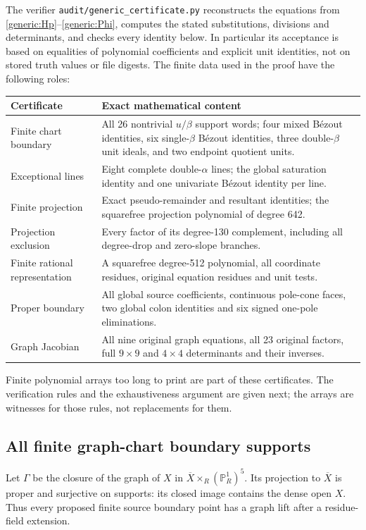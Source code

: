 \documentclass[11pt,a4paper]{article}
\theoremstyle{remark}\newtheorem{remark}[theorem]{Remark}
\begin{document}
The verifier \texttt{audit/generic\_certificate.py} reconstructs the
equations from \eqref{generic:Hp}--\eqref{generic:Phi}, computes the
stated substitutions, divisions and determinants, and checks every
identity below. In particular its acceptance is based on equalities of
polynomial coefficients and explicit unit identities, not on stored
truth values or file digests. The finite data used in the proof have
the following roles:
\begin{center}\small
\begin{tabular}{@{}lp{}@{}}\toprule
Certificate & Exact mathematical content\\\midrule
Finite chart boundary & All 26 nontrivial $u/\beta$ support words;
four mixed B\'ezout identities, six single-$\beta$ B\'ezout identities,
three double-$\beta$ unit ideals, and two endpoint quotient units.\\
Exceptional lines & Eight complete double-$\alpha$ lines; the global
saturation identity and one univariate B\'ezout identity per line.\\
Finite projection & Exact pseudo-remainder and resultant identities;
the squarefree projection polynomial of degree 642.\\
Projection exclusion & Every factor of its degree-130 complement,
including all degree-drop and zero-slope branches.\\
Finite rational representation & A squarefree degree-512 polynomial,
all coordinate residues, original equation residues and unit tests.\\
Proper boundary & All global source coefficients, continuous pole-cone
faces, two global colon identities and six signed one-pole eliminations.\\
Graph Jacobian & All nine original graph equations, all 23 original
factors, full $9\times9$ and $4\times4$ determinants and their inverses.\\
\bottomrule\end{tabular}
\end{center}
Finite polynomial arrays too long to print are part of these certificates.
The verification rules and the exhaustiveness argument are given next;
the arrays are witnesses for those rules, not replacements for them.

\subsection{All finite graph-chart boundary supports}
\label{generic:chartboundary}
Let $\Gamma$ be the closure of the graph of $X$ in
$\overline X\times_R(\mathbb P^1_R)^5$. Its projection to
$\overline X$ is proper and surjective on supports: its closed image
contains the dense open $X$. Thus every proposed finite source boundary
point has a graph lift after a residue-field extension.
\end{document}
